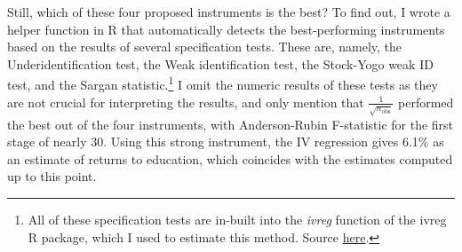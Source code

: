 \begin{table}[!t]
\centering
\footnotesize
\singlespace
\caption{Relaxing the exogeneity assumption}
\label{tab:IV-p}
\end{table}

Still, which of these four proposed instruments is the best? To find out, I wrote a helper function in R that automatically detects the best-performing instruments based on the results of several specification tests. These are, namely, the Underidentification test, the Weak identification test, the Stock-Yogo weak ID test, and the Sargan statistic.\footnote{All of these specification tests are in-built into the \textit{ivreg} function of the {ivreg} R package, which I used to estimate this method. Source \href{https://cran.r-project.org/package=ivreg}{here}.} I omit the numeric results of these tests as they are not crucial for interpreting the results, and only mention that $\frac{1}{\sqrt{n_{\text{obs}}}}$ performed the best out of the four instruments, with Anderson-Rubin F-statistic for the first stage of nearly 30. Using this strong instrument, the \ac{IV} regression gives 6.1\% as an estimate of returns to education, which coincides with the estimates computed up to this point.

